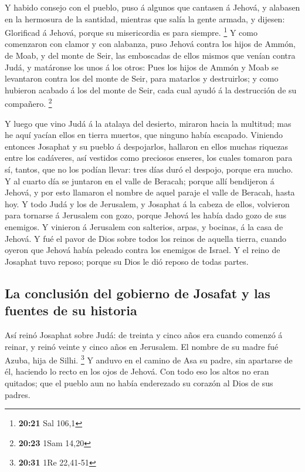  Y habido consejo con el pueblo, puso á algunos que
cantasen á Jehová, y alabasen en la hermosura de la santidad, mientras
que salía la gente armada, y dijesen: Glorificad á Jehová, porque su
misericordia es para siempre. \footnote{\textbf{20:21} Sal 106,1}
 Y como comenzaron con clamor y con alabanza, puso Jehová
contra los hijos de Ammón, de Moab, y del monte de Seir, las emboscadas
de ellos mismos que venían contra Judá, y matáronse los unos á los
otros:  Pues los hijos de Ammón y Moab se levantaron
contra los del monte de Seir, para matarlos y destruirlos; y como
hubieron acabado á los del monte de Seir, cada cual ayudó á la
destrucción de su compañero. \footnote{\textbf{20:23} 1Sam 14,20}

 Y luego que vino Judá á la atalaya del desierto, miraron
hacia la multitud; mas he aquí yacían ellos en tierra muertos, que
ninguno había escapado.  Viniendo entonces Josaphat y su
pueblo á despojarlos, hallaron en ellos muchas riquezas entre los
cadáveres, así vestidos como preciosos enseres, los cuales tomaron para
sí, tantos, que no los podían llevar: tres días duró el despojo, porque
era mucho.  Y al cuarto día se juntaron en el valle de
Beracah; porque allí bendijeron á Jehová, y por esto llamaron el nombre
de aquel paraje el valle de Beracah, hasta hoy.  Y todo
Judá y los de Jerusalem, y Josaphat á la cabeza de ellos, volvieron para
tornarse á Jerusalem con gozo, porque Jehová les había dado gozo de sus
enemigos.  Y vinieron á Jerusalem con salterios, arpas, y
bocinas, á la casa de Jehová.  Y fué el pavor de Dios
sobre todos los reinos de aquella tierra, cuando oyeron que Jehová había
peleado contra los enemigos de Israel.  Y el reino de
Josaphat tuvo reposo; porque su Dios le dió reposo de todas partes.

\hypertarget{la-conclusiuxf3n-del-gobierno-de-josafat-y-las-fuentes-de-su-historia}{%
\subsection{La conclusión del gobierno de Josafat y las fuentes de su
historia}\label{la-conclusiuxf3n-del-gobierno-de-josafat-y-las-fuentes-de-su-historia}}

 Así reinó Josaphat sobre Judá: de treinta y cinco años
era cuando comenzó á reinar, y reinó veinte y cinco años en Jerusalem.
El nombre de su madre fué Azuba, hija de Silhi. \footnote{\textbf{20:31}
  1Re 22,41-51}  Y anduvo en el camino de Asa su padre,
sin apartarse de él, haciendo lo recto en los ojos de Jehová.
 Con todo eso los altos no eran quitados; que el pueblo
aun no había enderezado su corazón al Dios de sus padres.

